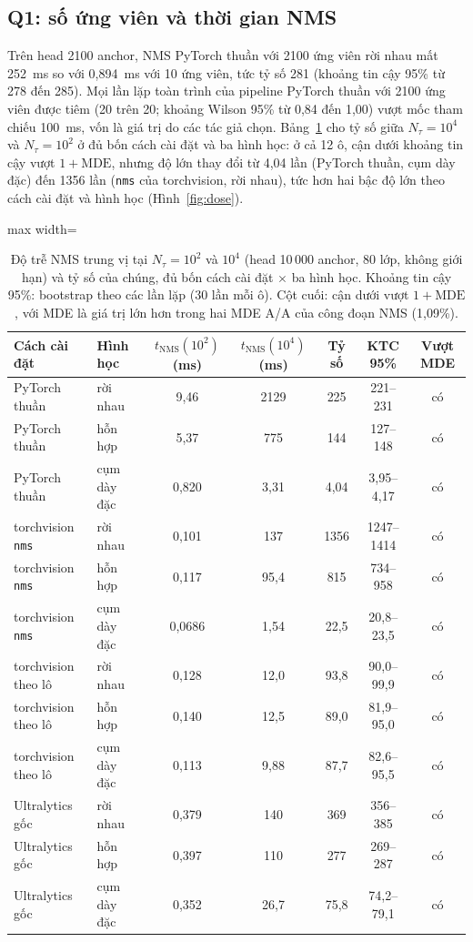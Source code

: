 \documentclass[a4paper,fleqn]{cas-dc}
\newcommand{\Ntau}{N_{\tau}}
\begin{document}
\subsection{Q1: số ứng viên và thời gian NMS}
\label{sec:q1}
Trên head 2100 anchor, NMS PyTorch thuần với 2100 ứng viên rời nhau mất 252~ms so với 0,894~ms với 10 ứng viên, tức tỷ số 281 (khoảng tin cậy 95\% từ 278 đến 285). Mọi lần lặp toàn trình của pipeline PyTorch thuần với 2100 ứng viên được tiêm (20 trên 20; khoảng Wilson 95\% từ 0,84 đến 1,00) vượt mốc tham chiếu 100~ms, vốn là giá trị do các tác giả chọn. Bảng~\ref{tab:dose} cho tỷ số giữa $\Ntau=10^4$ và $\Ntau=10^2$ ở đủ bốn cách cài đặt và ba hình học: ở cả 12 ô, cận dưới khoảng tin cậy vượt $1+\mathrm{MDE}$, nhưng độ lớn thay đổi từ 4,04 lần (PyTorch thuần, cụm dày đặc) đến 1356 lần (\texttt{nms} của torchvision, rời nhau), tức hơn hai bậc độ lớn theo cách cài đặt và hình học (Hình~\ref{fig:dose}).

\begin{table}[!tp]
\centering\small
\caption{Độ trễ NMS trung vị tại $\Ntau=10^2$ và $10^4$ (head 10\,000 anchor, 80 lớp, không giới hạn) và tỷ số của chúng, đủ bốn cách cài đặt $\times$ ba hình học. Khoảng tin cậy 95\%: bootstrap theo các lần lặp (30 lần mỗi ô). Cột cuối: cận dưới vượt $1+\mathrm{MDE}$, với MDE là giá trị lớn hơn trong hai MDE A/A của công đoạn NMS (1,09\%).}
\label{tab:dose}
\begin{adjustbox}{max width=\textwidth}
\begin{tabular}{@{}llccccc@{}}
\toprule
Cách cài đặt & Hình học & $t_{\mathrm{NMS}}(10^2)$ (ms) & $t_{\mathrm{NMS}}(10^4)$ (ms) & Tỷ số & KTC 95\% & Vượt MDE \\
\midrule
PyTorch thuần & rời nhau & 9,46 & 2129 & 225 & 221--231 & có \\
PyTorch thuần & hỗn hợp & 5,37 & 775 & 144 & 127--148 & có \\
PyTorch thuần & cụm dày đặc & 0,820 & 3,31 & 4,04 & 3,95--4,17 & có \\
torchvision \texttt{nms} & rời nhau & 0,101 & 137 & 1356 & 1247--1414 & có \\
torchvision \texttt{nms} & hỗn hợp & 0,117 & 95,4 & 815 & 734--958 & có \\
torchvision \texttt{nms} & cụm dày đặc & 0,0686 & 1,54 & 22,5 & 20,8--23,5 & có \\
torchvision theo lô & rời nhau & 0,128 & 12,0 & 93,8 & 90,0--99,9 & có \\
torchvision theo lô & hỗn hợp & 0,140 & 12,5 & 89,0 & 81,9--95,0 & có \\
torchvision theo lô & cụm dày đặc & 0,113 & 9,88 & 87,7 & 82,6--95,5 & có \\
Ultralytics gốc & rời nhau & 0,379 & 140 & 369 & 356--385 & có \\
Ultralytics gốc & hỗn hợp & 0,397 & 110 & 277 & 269--287 & có \\
Ultralytics gốc & cụm dày đặc & 0,352 & 26,7 & 75,8 & 74,2--79,1 & có \\
\bottomrule
\end{tabular}
\end{adjustbox}
\end{table}
\end{document}
